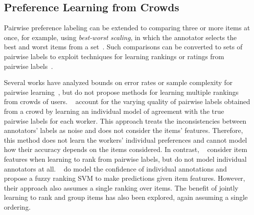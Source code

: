 \subsection{Preference Learning from Crowds}

Pairwise preference labeling can be extended to comparing three or more items at once, for example, using 
\emph{best-worst scaling}, in which the annotator selects the best and worst items from a set~\cite{??}. 
Such comparisons can be converted to sets of pairwise labels to exploit techniques for 
learning rankings or ratings from pairwise labels~\cite{billionsofthings}.

Several works have analyzed bounds on error rates or sample complexity for pairwise 
learning~\citep{chen2015spectral,shah2015estimation}, but do not propose methods
for learning multiple rankings from crowds of users.
~\citet{chen2013pairwise} account for the varying quality of pairwise labels obtained from a crowd
by learning an individual model of agreement with the true pairwise labels for each worker.  
This approach treats the inconsistencies between annotators' labels as noise and does not consider the
items' features. Therefore, this method does not learn the workers' individual preferences
and cannot model how their accuracy depends on the items considered. 
In contrast, ~\citet{fu2016robust} consider item features when learning to rank from pairwise labels, 
but do not model individual annotators at all.
~\citet{uchida2017entity} do model the confidence of individual annotations
and propose a fuzzy ranking SVM to make predictions given item features. 
However, their approach also assumes a single ranking over items.
The benefit of jointly learning to rank and group items has also been explored\citep{li2018simultaneous}, again assuming a single ordering.

